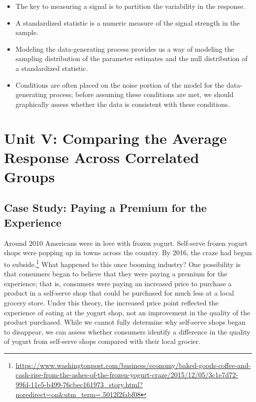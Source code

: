 \documentclass[]{book}
\providecommand{\tightlist}{%
  \setlength{\itemsep}{0pt}\setlength{\parskip}{0pt}}
\let\rmarkdownfootnote\footnote%
\def\footnote{\protect\rmarkdownfootnote}
\theoremstyle{plain}
\theoremstyle{mydefn}
\theoremstyle{myexmpl}
\theoremstyle{remark}
\begin{document}
\begin{itemize}
\tightlist
\item
  The key to measuring a signal is to partition the variability in the
  response.
\item
  A standardized statistic is a numeric measure of the signal strength
  in the sample.
\item
  Modeling the data-generating process provides us a way of modeling the
  sampling distribution of the parameter estimates and the null
  distribution of a standardized statistic.
\item
  Conditions are often placed on the noise portion of the model for the
  data-generating process; before assuming these conditions are met, we
  should graphically assess whether the data is consistent with these
  conditions.
\end{itemize}


\part{Unit V: Comparing the Average Response Across
Correlated
Groups}\label{part-unit-v-comparing-the-average-response-across-correlated-groups}

\hypertarget{CaseYogurt}{\chapter{Case Study: Paying a Premium for the
Experience}\label{CaseYogurt}}

Around 2010 Americans were in love with frozen yogurt. Self-serve frozen
yogurt shops were popping up in towns across the country. By 2016, the
craze had begun to subside.\footnote{\url{https://www.washingtonpost.com/business/economy/baked-goods-coffee-and-cash-rise-from-the-ashes-of-the-frozen-yogurt-craze/2015/12/05/3c1e7d72-99fd-11e5-b499-76cbec161973_story.html?noredirect=on\&utm_term=.5012f2fabf08}}
What happened to this once booming industry? One possibility is that
consumers began to believe that they were paying a premium for the
experience; that is, consumers were paying an increased price to
purchase a product in a self-serve shop that could be purchased for much
less at a local grocery store. Under this theory, the increased price
point reflected the experience of eating at the yogurt shop, not an
improvement in the quality of the product purchased. While we cannot
fully determine why self-serve shops began to disappear, we can assess
whether consumers identify a difference in the quality of yogurt from
self-serve shops compared with their local grocier.
\end{document}
